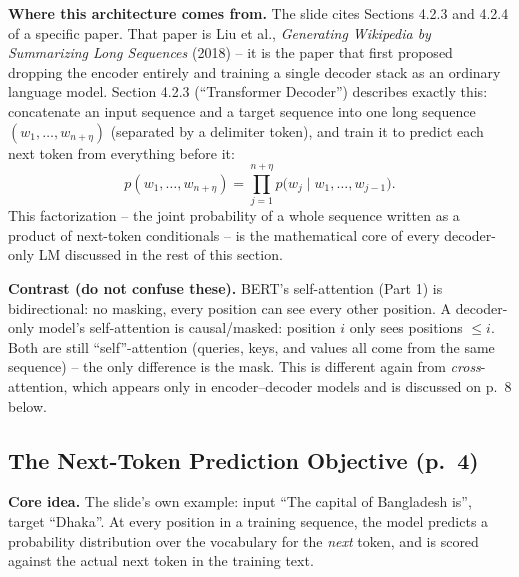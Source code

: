 \documentclass[11pt]{article}
\begin{document}
\textbf{Where this architecture comes from.} The slide cites Sections 4.2.3 and 4.2.4 of a specific paper. That paper is Liu et al., \emph{Generating Wikipedia by Summarizing Long Sequences} (2018) -- it is the paper that first proposed dropping the encoder entirely and training a single decoder stack as an ordinary language model. Section 4.2.3 (``Transformer Decoder'') describes exactly this: concatenate an input sequence and a target sequence into one long sequence $(w_1,\dots,w_{n+\eta})$ (separated by a delimiter token), and train it to predict each next token from everything before it:
\[
p(w_1,\dots,w_{n+\eta}) = \prod_{j=1}^{n+\eta} p\big(w_j \mid w_1,\dots,w_{j-1}\big).
\]
This factorization -- the joint probability of a whole sequence written as a product of next-token conditionals -- is the mathematical core of every decoder-only LM discussed in the rest of this section.

\textbf{Contrast (do not confuse these).} BERT's self-attention (Part 1) is bidirectional: no masking, every position can see every other position. A decoder-only model's self-attention is causal/masked: position $i$ only sees positions $\le i$. Both are still ``self''-attention (queries, keys, and values all come from the same sequence) -- the only difference is the mask. This is different again from \emph{cross}-attention, which appears only in encoder--decoder models and is discussed on p.\ 8 below.

\subsection{The Next-Token Prediction Objective (p.\ 4)}

\textbf{Core idea.} The slide's own example: input ``The capital of Bangladesh is'', target ``Dhaka''. At every position in a training sequence, the model predicts a probability distribution over the vocabulary for the \emph{next} token, and is scored against the actual next token in the training text.
\end{document}
